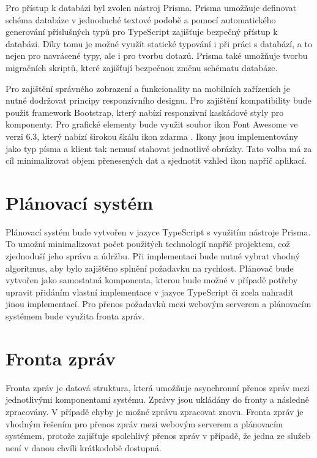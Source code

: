 Pro přístup k databázi byl zvolen nástroj Prisma. Prisma umožňuje definovat schéma databáze v jednoduché textové podobě a pomocí automatického generování
příslušných typů pro TypeScript zajišťuje bezpečný přístup k databázi. Díky tomu je možné využít statické typování i při práci s databází, a to nejen 
pro navrácené typy, ale i pro tvorbu dotazů. Prisma také umožňuje tvorbu migračních skriptů, které zajišťují bezpečnou změnu schématu databáze. 

Pro zajištění správného zobrazení a funkcionality na mobilních zařízeních je nutné dodržovat principy responzivního designu. Pro zajištění kompatibility bude použit
framework Bootstrap, který nabízí responzivní kaskádové styly pro komponenty. Pro grafické elementy bude využit 
soubor ikon Font Awesome ve verzi 6.3, který nabízí širokou škálu ikon zdarma \cite{fontawesome}. Ikony jsou implementovány jako typ písma a klient tak nemusí stahovat jednotlivé obrázky.
Tato volba má za cíl minimalizovat objem přenesených dat a sjednotit vzhled ikon napříč aplikací.

\section{Plánovací systém}

Plánovací systém bude vytvořen v jazyce TypeScript s využitím nástroje Prisma. To umožní minimalizovat počet použitých technologií napříč projektem,
což zjednoduší jeho správu a údržbu. Při implementaci bude nutné vybrat vhodný algoritmus, aby bylo zajištěno splnění požadavku na rychlost.
Plánovač bude vytvořen jako samostatná komponenta, kterou bude možné v případě potřeby upravit přidáním vlastní implementace v jazyce TypeScript
či zcela nahradit jinou implementací. 
Pro přenos požadavků mezi webovým serverem a plánovacím systémem bude využita fronta zpráv.

\section{Fronta zpráv}

Fronta zpráv je datová struktura, která umožňuje asynchronní přenos zpráv mezi jednotlivými komponentami systému. Zprávy jsou ukládány do fronty
a následně zpracovány. V případě chyby je možné zprávu zpracovat znovu. Fronta zpráv je vhodným řešením pro přenos zpráv mezi webovým serverem a plánovacím systémem,
protože zajišťuje spolehlivý přenos zpráv v případě, že jedna ze služeb není v danou chvíli krátkodobě dostupná.

